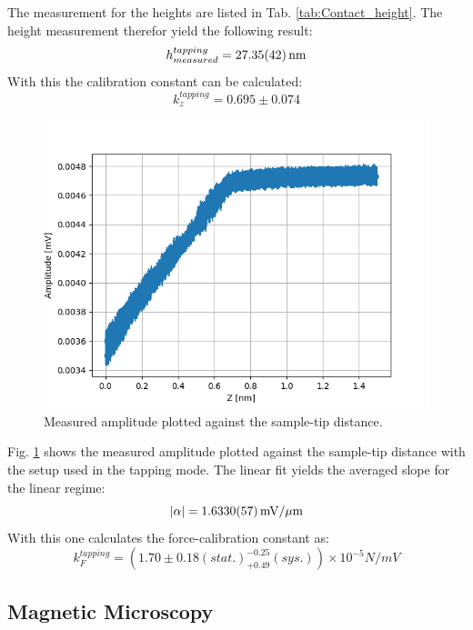 \documentclass[%
 reprint,
amsmath,amssymb,
pra,
]{revtex4-1}
\begin{document}
The measurement for the heights are listed in Tab. \ref{tab:Contact_height}. The height measurement therefor yield the following result:
\begin{equation*}
h_{measured}^{tapping} = \SI{27.35 \pm 0.42}{nm}
\end{equation*}
With this the calibration constant can be calculated:
\begin{equation*}
k_z^{tapping} = 0.695 \pm 0.074
\end{equation*}

\begin{figure}
\centering
\includegraphics[scale=0.5]{Bilder/Tapping_Mode/Snap_in_curve.PNG}
\caption{Measured amplitude plotted against the sample-tip distance.}
\label{fig:Tapping_snap_in}
\end{figure}

Fig. \ref{fig:Tapping_snap_in} shows the measured amplitude plotted against the sample-tip distance with the setup used in the tapping mode. The linear fit yields the averaged slope for the linear regime:
\begin{equation*} 
|\alpha| = \SI{1.6330 \pm 0.0057}{mV \per \mu m}
\end{equation*}
With this one calculates the force-calibration constant as:
\begin{equation*}
k_F^{tapping} = (1.70 \pm 0.18 (stat.) _{+ 0.49} ^{- 0.25} (sys.)) \times 10^{-5} \si{N \per mV}
\end{equation*}

\subsection{Magnetic Microscopy}
\end{document}
